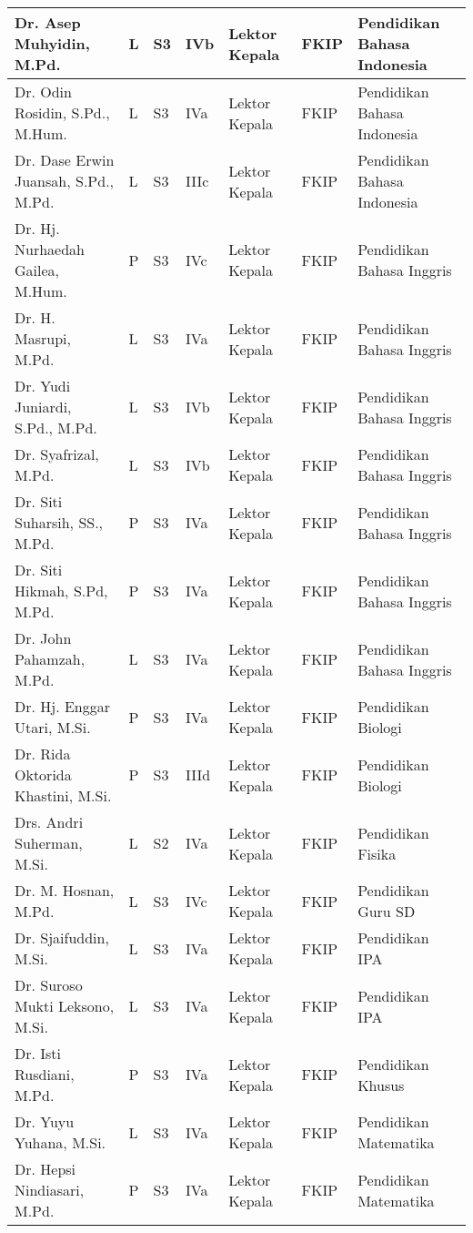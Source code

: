 \documentclass[
]{book}
\begin{document}
\begin{longtable}{l|l|l|l|l|l|l}
\hline
Dr. Asep Muhyidin, M.Pd. & L & S3 & IVb & Lektor Kepala & FKIP & Pendidikan Bahasa Indonesia\\
\hline
Dr. Odin Rosidin, S.Pd., M.Hum. & L & S3 & IVa & Lektor Kepala & FKIP & Pendidikan Bahasa Indonesia\\
\hline
Dr. Dase Erwin Juansah, S.Pd., M.Pd. & L & S3 & IIIc & Lektor Kepala & FKIP & Pendidikan Bahasa Indonesia\\
\hline
Dr. Hj. Nurhaedah Gailea, M.Hum. & P & S3 & IVc & Lektor Kepala & FKIP & Pendidikan Bahasa Inggris\\
\hline
Dr. H. Masrupi, M.Pd. & L & S3 & IVa & Lektor Kepala & FKIP & Pendidikan Bahasa Inggris\\
\hline
Dr. Yudi Juniardi, S.Pd., M.Pd. & L & S3 & IVb & Lektor Kepala & FKIP & Pendidikan Bahasa Inggris\\
\hline
Dr. Syafrizal, M.Pd. & L & S3 & IVb & Lektor Kepala & FKIP & Pendidikan Bahasa Inggris\\
\hline
Dr. Siti Suharsih, SS., M.Pd. & P & S3 & IVa & Lektor Kepala & FKIP & Pendidikan Bahasa Inggris\\
\hline
Dr. Siti Hikmah, S.Pd, M.Pd. & P & S3 & IVa & Lektor Kepala & FKIP & Pendidikan Bahasa Inggris\\
\hline
Dr. John Pahamzah, M.Pd. & L & S3 & IVa & Lektor Kepala & FKIP & Pendidikan Bahasa Inggris\\
\hline
Dr. Hj. Enggar Utari, M.Si. & P & S3 & IVa & Lektor Kepala & FKIP & Pendidikan Biologi\\
\hline
Dr. Rida Oktorida Khastini, M.Si. & P & S3 & IIId & Lektor Kepala & FKIP & Pendidikan Biologi\\
\hline
Drs. Andri Suherman, M.Si. & L & S2 & IVa & Lektor Kepala & FKIP & Pendidikan Fisika\\
\hline
Dr. M. Hosnan, M.Pd. & L & S3 & IVc & Lektor Kepala & FKIP & Pendidikan Guru SD\\
\hline
Dr. Sjaifuddin, M.Si. & L & S3 & IVa & Lektor Kepala & FKIP & Pendidikan IPA\\
\hline
Dr. Suroso Mukti Leksono, M.Si. & L & S3 & IVa & Lektor Kepala & FKIP & Pendidikan IPA\\
\hline
Dr. Isti Rusdiani, M.Pd. & P & S3 & IVa & Lektor Kepala & FKIP & Pendidikan Khusus\\
\hline
Dr. Yuyu Yuhana, M.Si. & L & S3 & IVa & Lektor Kepala & FKIP & Pendidikan Matematika\\
\hline
Dr. Hepsi Nindiasari, M.Pd. & P & S3 & IVa & Lektor Kepala & FKIP & Pendidikan Matematika\\

\end{longtable}
\end{document}
